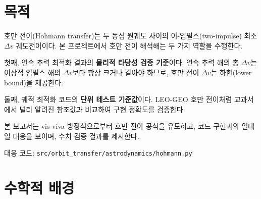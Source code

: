 \documentclass[11pt]{article}
\begin{document}
\drawborder
\thispagestyle{firstpage}

\def\lighterdate{February 12, 2026}

\begin{abstract}
호만 전이(Hohmann transfer)는 두 동심 원궤도 사이의 이-임펄스(two-impulse) 최소 $\Delta v$ 궤도전이이다.
본 보고서는 vis-viva 방정식으로부터 호만 전이 공식을 유도하고, 코드 구현과의 일대일 대응을 보이며, 수치 검증 결과를 제시한다.
호만 전이 해석해는 연속 추력 최적화 결과의 물리적 타당성 검증 기준(하한)과 궤적 최적화 코드의 단위 테스트 기준값으로 활용된다.
\end{abstract}

\section{목적}

호만 전이(Hohmann transfer)는 두 동심 원궤도 사이의 이-임펄스(two-impulse) 최소 $\Delta v$ 궤도전이이다. 본 프로젝트에서 호만 전이 해석해는 두 가지 역할을 수행한다.

첫째, 연속 추력 최적화 결과의 \textbf{물리적 타당성 검증 기준}이다. 연속 추력 해의 총 $\Delta v$는 이상적 임펄스 해의 $\Delta v$보다 항상 크거나 같아야 하므로, 호만 전이 $\Delta v$는 하한(lower bound)을 제공한다.

둘째, 궤적 최적화 코드의 \textbf{단위 테스트 기준값}이다. LEO-GEO 호만 전이처럼 교과서에서 널리 알려진 참조값과 비교하여 구현 정확도를 검증한다.

본 보고서는 vis-viva 방정식으로부터 호만 전이 공식을 유도하고, 코드 구현과의 일대일 대응을 보이며, 수치 검증 결과를 제시한다.

\vspace{0.5em}
\noindent 대응 코드: \texttt{src/orbit\_transfer/astrodynamics/hohmann.py}

\section{수학적 배경}
\end{document}
